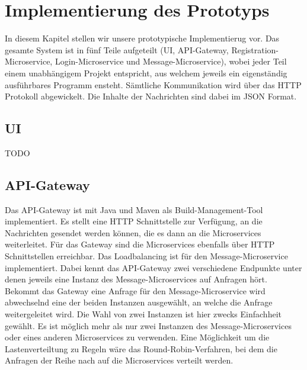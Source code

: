 \section{Implementierung des Prototyps}

In diesem Kapitel stellen wir unsere prototypische Implementierug vor. Das gesamte System ist in fünf Teile aufgeteilt (UI, API-Gateway, Registration-Microservice, Login-Microservice und Message-Microservice), wobei jeder Teil einem unabhängigem Projekt entspricht, aus welchem jeweils ein eigenständig ausführbares Programm ensteht.
Sämtliche Kommunikation wird über das HTTP Protokoll abgewickelt. Die Inhalte der Nachrichten sind dabei im JSON Format.

\subsection{UI}
TODO


\subsection{API-Gateway}
Das API-Gateway ist mit Java und Maven als Build-Management-Tool implementiert. Es stellt eine HTTP Schnittstelle zur Verfügung, an die Nachrichten gesendet werden können, die es dann an die Microservices weiterleitet. Für das Gateway sind die Microservices ebenfalls über HTTP Schnittstellen erreichbar.
Das Loadbalancing ist für den Message-Microservice implementiert. Dabei kennt das API-Gateway zwei verschiedene Endpunkte unter denen jeweils eine Instanz des Message-Microservices auf Anfragen hört. Bekommt das Gateway eine Anfrage für den Message-Microservice wird abwechselnd eine der beiden Instanzen ausgewählt, an welche die Anfrage weitergeleitet wird. Die Wahl von zwei Instanzen ist hier zwecks Einfachheit gewählt. Es ist möglich mehr als nur zwei Instanzen des Message-Microservices oder eines anderen Microservices zu verwenden. Eine Möglichkeit um die Lastenverteiltung zu Regeln wäre das Round-Robin-Verfahren, bei dem die Anfragen der Reihe nach auf die Microservices verteilt werden.

